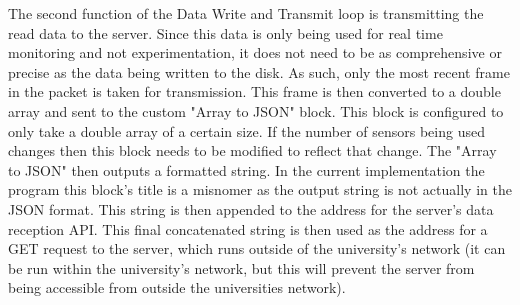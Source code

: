 \documentclass[10pt,technote]{IEEEtran}
\begin{document}
\par
The second function of the Data Write and Transmit loop is transmitting the read data to the server. Since this data is only being used for real time monitoring and not experimentation, it does not need to be as comprehensive or precise as the data being written to the disk. As such, only the most recent frame in the packet is taken for transmission. This frame is then converted to a double array and sent to the custom "Array to JSON" block. This block is configured to only take a double array of a certain size. If the number of sensors being used changes then this block needs to be modified to reflect that change. The "Array to JSON" then outputs a formatted string. In the current implementation the program this block's title is a misnomer as the output string is not actually in the JSON format. This string is then appended to the address for the server's data reception API. This final concatenated string is then used as the address for a GET request to the server, which runs outside of the university's network (it can be run within the university's network, but this will prevent the server from being accessible from outside the universities network).
\end{document}
